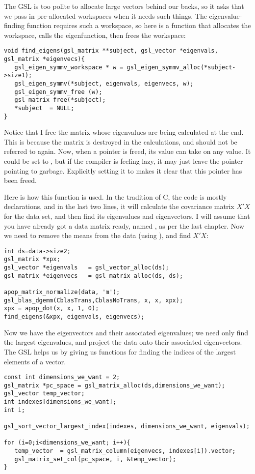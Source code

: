 The GSL is too polite to allocate large vectors behind our backs, so
it asks that we pass in pre-allocated workspaces when it needs such
things. The eigenvalue-finding function requires such a workspace, so
here is a function that allocates the workspace, calls the eigenfunction,
then frees the workspace:
\begin{lstlisting}
void find_eigens(gsl_matrix **subject, gsl_vector *eigenvals, gsl_matrix *eigenvecs){
   gsl_eigen_symmv_workspace * w = gsl_eigen_symmv_alloc(*subject->size1);
   gsl_eigen_symmv(*subject, eigenvals, eigenvecs, w);
   gsl_eigen_symmv_free (w);
   gsl_matrix_free(*subject);
   *subject  = NULL;
}
\end{lstlisting}

Notice that I free the matrix whose eigenvalues are being calculated at
the end.  This is because the matrix is destroyed in the calculations,
and should not be referred to again. Now, when a pointer is freed, its value
can take on any value. It could be set to , but if the compiler
is feeling lazy, it may just leave the pointer pointing to garbage.
Explicitly setting it to  makes it clear that this pointer has
been freed.

Here is how this function is used. In the tradition of C, the code is
mostly declarations, and in the last two lines, it will calculate the
covariance matrix $X'X$ for the data set, and then find its eigenvalues
and eigenvectors.  
I will assume that you have already got a data matrix ready, named
, as per the last chapter. Now we need to remove the means
from the data (using ), and find $X'X$:

\begin{lstlisting}
int ds=data->size2;
gsl_matrix *xpx;
gsl_vector *eigenvals   = gsl_vector_alloc(ds);
gsl_matrix *eigenvecs   = gsl_matrix_alloc(ds, ds);

apop_matrix_normalize(data, 'm');
gsl_blas_dgemm(CblasTrans,CblasNoTrans, x, x, xpx);
xpx = apop_dot(x, x, 1, 0);
find_eigens(&xpx, eigenvals, eigenvecs);
\end{lstlisting}

Now we have the eigenvectors and their associated eigenvalues; we need only find
the largest eigenvalues, and project the data onto their associated eigenvectors.
The GSL helps us by giving us functions for
finding the indices of the largest elements of a vector.
\begin{lstlisting}
const int dimensions_we_want = 2;
gsl_matrix *pc_space = gsl_matrix_alloc(ds,dimensions_we_want);
gsl_vector temp_vector;
int indexes[dimensions_we_want];
int i;

gsl_sort_vector_largest_index(indexes, dimensions_we_want, eigenvals);

for (i=0;i<dimensions_we_want; i++){
   temp_vector  = gsl_matrix_column(eigenvecs, indexes[i]).vector;
   gsl_matrix_set_col(pc_space, i, &temp_vector);
}
\end{lstlisting}

